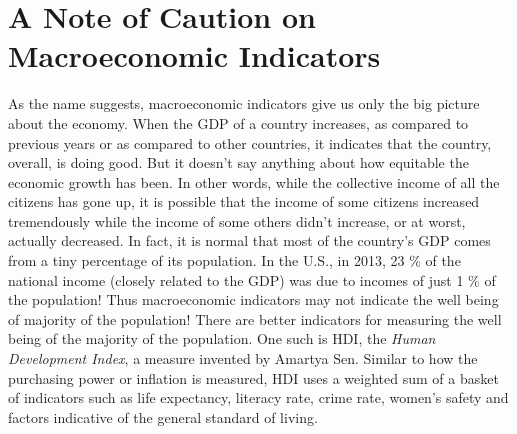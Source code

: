 \section{A Note of Caution on Macroeconomic Indicators}
As the name suggests, macroeconomic indicators give us only the big picture about the economy. When the GDP of a country increases, as compared to previous years or as compared to other countries, it indicates that the country, overall, is doing good. But it doesn't say anything about how equitable the economic growth has been. In other words, while the collective income of all the citizens has gone up, it is possible that the income of some citizens increased tremendously while the income of some others didn't increase, or at worst, actually decreased. In fact, it is normal that most of the country's GDP comes from a tiny percentage of its population. In the U.S., in 2013, 23 \% of the national income (closely related to the GDP) was due to incomes of just 1 \% of the population! Thus macroeconomic indicators may not indicate the well being of majority of the population! There are better indicators for measuring the well being of the majority of the population. One such is HDI, the \emph{Human Development Index}, a measure invented by Amartya Sen. Similar to how the purchasing power or inflation is measured, HDI uses a weighted sum of a basket of indicators such as life expectancy, literacy rate, crime rate, women's safety and factors indicative of the general standard of living. 
